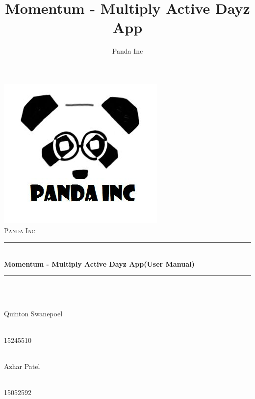 \documentclass[11pt]{article}
\author{Panda Inc}
\title{Momentum - Multiply Active Dayz App}
\begin{document}
\begin{titlepage}

	\begin{center}
        \includegraphics[width=0.7\linewidth]{images/panda.jpg}\\[1cm]
		\textsc{\LARGE Panda Inc}\\[0.3cm]
		\rule{\linewidth}{0.5mm} \\[1cm]
		{ \huge \bfseries Momentum - Multiply Active Dayz App\newline \newline (User Manual)}\\[0.5cm]
		\rule{\linewidth}{0.5mm} \\[1cm]


		\begin{minipage}{0.4\textwidth}
			\begin{flushleft} \large
				\emph{} \\
				Quinton {Swanepoel}
			\end{flushleft}
		\end{minipage}
		\begin{minipage}{0.4\textwidth}
			\begin{flushright} \large
				\emph{} \\
				15245510
			\end{flushright}
		\end{minipage}

		\begin{minipage}{0.4\textwidth}
			\begin{flushleft} \large
            	\emph{} \\
				Azhar {Patel}
			\end{flushleft}
		\end{minipage}
		\begin{minipage}{0.4\textwidth}
			\begin{flushright} \large
				\emph{} \\
				15052592
			\end{flushright}
		\end{minipage}


\end{center}
\end{titlepage}
\end{document}
